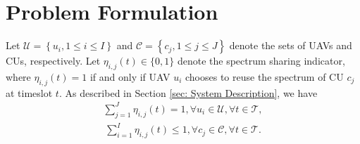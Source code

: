 \documentclass[10pt,journal,compsoc]{IEEEtran}
\begin{document}

\section{Problem Formulation}\label{sec: Problem Formulation}
Let $\mathcal{U} = \left\{u_{i}, 1 \le i \le I\right\}$ and $\mathcal{C} = \left\{c_{j}, 1 \le j \le J\right\}$ denote the sets of UAVs and CUs, respectively. Let $\eta_{i, j}(t) \in \{0,1\}$ denote the spectrum sharing indicator, where
$\eta_{i, j}(t) = 1$ if and only if UAV $u_{i}$ chooses to reuse the spectrum of CU $c_{j}$ at timeslot $t$. As described in Section \ref{sec: System Description}, we have 
\begin{align}\label{P0:UAV-one-CU}
    \sum_{j = 1}^{J}\eta_{i, j}(t) = 1, \forall u_{i} \in \mathcal{U}, \forall t \in \mathcal{T},
\end{align}
\begin{align}\label{P0:CU-Less-One-UAV}
    \sum_{i = 1}^{I} \eta_{i, j}(t) \le 1, \forall c_{j} \in \mathcal{C}, \forall t \in \mathcal{T}.
\end{align}










\end{document}
